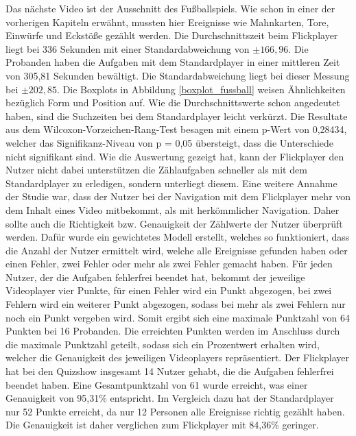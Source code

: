 \documentclass[11pt,a4paper]{report}
\begin{document}
Das nächste Video ist der Ausschnitt des Fußballspiels. Wie schon in einer der vorherigen Kapiteln erwähnt, mussten hier Ereignisse wie Mahnkarten, Tore, Einwürfe und Eckstöße gezählt werden. Die Durchschnittszeit beim Flickplayer liegt bei 336 Sekunden mit einer Standardabweichung von  $\pm 166,96$. Die Probanden haben die Aufgaben mit dem Standardplayer in einer mittleren Zeit von 305,81 Sekunden bewältigt. Die Standardabweichung liegt bei dieser Messung bei  $\pm 202,85$. Die Boxplots in Abbildung \ref{boxplot_fussball} weisen Ähnlichkeiten bezüglich Form und Position auf. Wie die Durchschnittswerte schon angedeutet haben, sind die Suchzeiten bei dem Standardplayer leicht verkürzt. Die Resultate aus dem Wilcoxon-Vorzeichen-Rang-Test besagen mit einem p-Wert von 0,28434, welcher das Signifikanz-Niveau von p = 0,05 übersteigt, dass die Unterschiede nicht signifikant sind. Wie die Auswertung gezeigt hat, kann der Flickplayer den Nutzer nicht dabei unterstützen die Zählaufgaben schneller als mit dem Standardplayer zu erledigen, sondern unterliegt diesem. Eine weitere Annahme der Studie war, dass der Nutzer bei der Navigation mit dem Flickplayer mehr von dem Inhalt eines Video mitbekommt, als mit herkömmlicher Navigation. Daher sollte auch die Richtigkeit bzw. Genauigkeit der Zählwerte der Nutzer überprüft werden. Dafür wurde ein gewichtetes Modell erstellt, welches so funktioniert, dass die Anzahl der Nutzer ermittelt wird, welche alle Ereignisse gefunden haben oder einen Fehler, zwei Fehler oder mehr als zwei Fehler gemacht haben. Für jeden Nutzer, der die Aufgaben fehlerfrei beendet hat, bekommt der jeweilige Videoplayer vier Punkte, für einen Fehler wird ein Punkt abgezogen, bei zwei Fehlern wird ein weiterer Punkt abgezogen, sodass bei mehr als zwei Fehlern nur noch ein Punkt vergeben wird. Somit ergibt sich eine maximale Punktzahl von 64 Punkten bei 16 Probanden. Die erreichten Punkten werden im Anschluss durch die maximale Punktzahl geteilt, sodass sich ein Prozentwert erhalten wird, welcher die Genauigkeit des jeweiligen Videoplayers repräsentiert. Der Flickplayer hat bei den Quizshow insgesamt 14 Nutzer gehabt, die die Aufgaben fehlerfrei beendet haben. Eine Gesamtpunktzahl von 61 wurde erreicht, was einer Genauigkeit von 95,31\% entspricht. Im Vergleich dazu hat der Standardplayer nur 52 Punkte erreicht, da nur 12 Personen alle Ereignisse richtig gezählt haben. Die Genauigkeit ist daher verglichen zum Flickplayer mit 84,36\% geringer.
\end{document}
